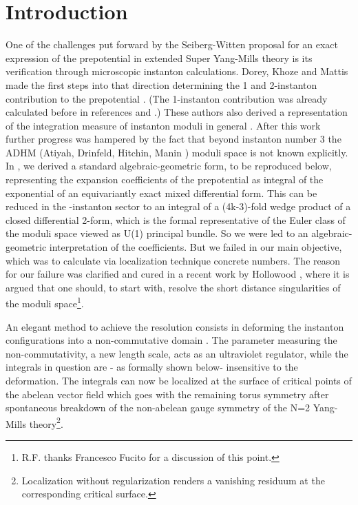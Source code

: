 \documentclass[a4paper,12pt]{article}
\begin{document}
\section{Introduction}
\renewcommand{\theequation}{1.\arabic{equation}}
One of the challenges put forward by the Seiberg-Witten proposal
\cite{sw1} for an exact expression of the prepotential in \coordHE{}
extended \coordHE{} Super Yang-Mills theory is its verification through
microscopic instanton calculations. Dorey, Khoze and Mattis made
the first steps into that direction determining the 1 and
2-instanton contribution to the prepotential \cite{dorey1}. (The
1-instanton contribution was already calculated before in
references \cite{finnel} and \cite{ito}.) These authors also
derived a representation of the integration measure of instanton
moduli in general \cite{dorey3}. After this work further progress
was hampered by the fact that beyond instanton number 3 the ADHM
(Atiyah, Drinfeld, Hitchin, Manin \cite{adhm}) moduli space is not
known explicitly. In \cite{FPS1}, \cite{FPS2} we derived a
standard algebraic-geometric form, to be reproduced below,
representing the expansion coefficients of the prepotential as
integral of the exponential of an equivariantly exact mixed
differential form. This can be reduced  in the \coordHE{}-instanton
sector to an integral of a (4k-3)-fold wedge product of a closed
differential 2-form, which is the formal representative of the
Euler class of the moduli space viewed as U(1) principal bundle.
So we were led to an algebraic-geometric interpretation of the
coefficients. But we failed in our main objective, which was to
calculate via localization technique concrete numbers. The reason
for our failure was clarified and cured in a recent work by
Hollowood \cite{H}, where it is argued that one should, to start
with, resolve the short distance singularities of the moduli
space\footnote{ R.F. thanks Francesco Fucito for a discussion of
this point.}.

An elegant method to achieve the resolution consists in deforming
the instanton configurations into a non-commutative domain
\cite{NSch}. The parameter measuring the non-commutativity, a new
length scale, acts as an ultraviolet regulator, while the
integrals in question are - as formally shown below- insensitive
to the deformation. The integrals can now be localized at the
surface of critical points of the abelean vector field which goes
with the remaining torus symmetry after spontaneous breakdown of
the non-abelean gauge symmetry of the N=2 Yang-Mills
theory\footnote{Localization without regularization renders a
vanishing residuum at the corresponding critical surface.}.
\end{document}
